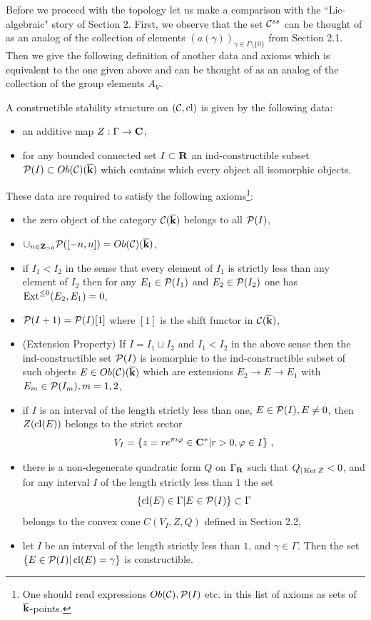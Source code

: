 \documentclass[12pt]{article}
\begin{document}
Before we proceed with the topology let us make a comparison with the ``Lie-algebraic" story of Section 2.
First, we observe that the set ${\mathcal C}^{ss}$ can be thought of as an analog of the collection of elements $(a(\gamma))_{\gamma \in \Gamma\setminus \{0\}}$ from Section 2.1.
Then we give the following definition of another data and axioms which is equivalent to the one given above and can be thought of as an analog of the collection of the group elements $A_V$.

\begin{defn} A constructible stability structure on $({\mathcal C},\operatorname{cl})$ is given by the following data:

\begin{itemize}

\item{an additive map $Z:\Gamma\to {\bf C}$,}

\item{for any bounded connected set $I\subset {\bf R}$ an ind-constructible subset
${\cal P}(I)\subset Ob({\mathcal C})({\overline{\bf k}})$ which contains which every object all isomorphic objects.}





\end{itemize}

These data are required to satisfy the following axioms\footnote{One should read expressions $Ob({\mathcal C}),{\cal P}(I)$ etc. in this list of axioms
 as sets of ${\overline{\bf k}}$-points.}:

\begin{itemize}
\item{the zero object of the category ${\mathcal C}({\overline{\bf k}})$ belongs to all ${\cal P}(I)$,}
\item{ $\cup_{n\in {\bf Z}_{>0}}{\cal P}([-n,n])=Ob({\mathcal C})({\overline{\bf k}})$,}
\item{if $I_1<I_2$ in the sense that every element of $I_1$ is strictly less than any
element of $I_2$ then for any $E_1\in {\cal P}(I_1)$ and $E_2\in {\cal P}(I_2)$ one has
$\operatorname{Ext}^{\le 0}(E_2,E_1)=0$,}
\item{${\cal P}(I+1)={\cal P}(I)[1]$ where $[1]$ is the shift functor in ${\mathcal C}({\overline{\bf k}})$,}
\item{(Extension Property) If $I=I_1\sqcup I_2$ and $I_1<I_2$ in the above sense then the ind-constructible set ${\cal P}(I)$ is isomorphic to the ind-constructible subset of such objects $E\in Ob({\mathcal C})({\overline{\bf k}})$ which are extensions $E_2\to E\to E_1$ with $E_m\in {\cal P}(I_m), m=1,2$,}
\item{if $I$ is an interval of the length strictly less than one, $E\in {\cal P}(I), E\ne 0$,
then  $Z(\operatorname{cl}(E))$ belongs to the strict sector 
$$V_I=\{z=re^{\pi i\varphi}\in {\bf C}^{\ast}|r>0,\varphi \in I\}\,\,,$$}
\item{there is a non-degenerate quadratic form $Q$ on $\Gamma_{{\bf R}}$ such that $Q_{|\operatorname{Ker}Z}<0$, and for any interval $I$ of the length strictly less than $1$ the set
$$\{\operatorname{cl}(E)\in \Gamma|E\in {\cal P}(I)\}\subset \Gamma$$
 belongs to the convex cone $C(V_I,Z,Q)$ defined in Section 2.2,}
\item{let $I$ be an interval of the length strictly less than $1$, and $\gamma\in \Gamma$. Then the set $\{E\in {\cal P}(I)| \operatorname{cl}(E)=\gamma\}$ is constructible.}


\end{itemize}
\end{defn}
\end{document}
